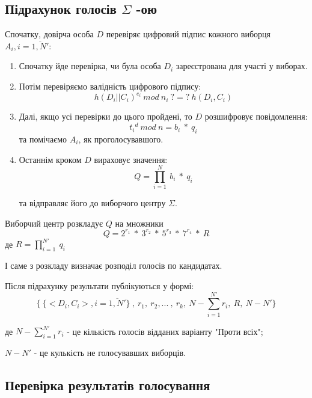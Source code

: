 \subsection{Підрахунок голосів $\Sigma$ -ою}

Спочатку, довірча особа $D$ перевіряє цифровий підпис кожного виборця $A_i, i=\overline{1,N'}$:
\begin{enumerate}
    \item Спочатку йде перевірка, чи була особа $D_i$ зареєстрована для участі у виборах.
    \item Потім перевіряємо валідність цифрового підпису: 
    \[h(D_i||C_i)^{e_i}\ mod\ n_i\ ?=?\ h(D_i, C_i) \]
    
    \item Далі, якщо усі перевірки до цього пройдені, то $D$ розшифровує повідомлення:
    \[ {t_i}^d\ mod\ n = b_i\ *\ q_i\]
    та помічаємо $A_i$, як проголосувавшого.

    \item Останнім кроком $D$ вираховує значення:
    \[ Q = \prod_{i=1}^N \ b_i\ *\ q_i\]

    та відправляє його до виборчого центру $\Sigma$.
\end{enumerate}

Виборчий центр розкладує $Q$ на множники 
\[ Q = 2^{r_1}\ *\ 3^{r_2}\ *\ 5^{r_3}\ *\ 7^{r_4}\ *\ R\]
де $R = \prod_{i=1}^{N'}\ q_i$

І саме з розкладу визначає розподіл голосів по кандидатах.

Після підрахунку результати публікуються у формі:
\[ \{\ \{<D_i,C_i>, i=\overline{1,N'}\}\ ,\ r_1,\ r_2, ...\ ,\ r_k,\ N-\sum_{i=1}^{N'}r_i ,\ R,\ N-N' \} \]

де $N-\sum_{i=1}^{N'}r_i$ - це кількість голосів відданих варіанту "Проти всіх";

$N-N'$ - це кулькість не голосувавших виборців.

\subsection{Перевірка результатів голосування}

